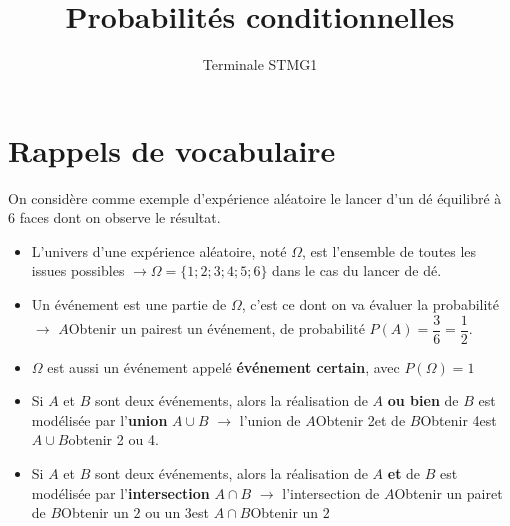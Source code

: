 \documentclass{poly}
\title{Probabilités conditionnelles}
\author{Terminale STMG1}
\date{}
\begin{document}
\maketitle

\section{Rappels de vocabulaire}
On considère comme exemple d'expérience aléatoire le lancer d'un dé équilibré à 6 faces dont on observe le résultat.
\begin{tcolorbox}
\begin{itemize}
\item L'univers d'une expérience aléatoire, noté $\Omega$, est l'ensemble de toutes les issues possibles $\to \Omega = \{1;2;3;4;5;6\}$ dans le cas du lancer de dé.
\item Un événement est une partie de $\Omega$, c'est ce dont on va évaluer la probabilité $\to$ $A$\og Obtenir un pair\fg est un événement, de probabilité $P(A) = \dfrac{3}{6} = \dfrac{1}{2}$.
\item $\Omega$ est aussi un événement appelé \textbf{événement certain}, avec $P(\Omega) = 1$
\item Si $A$ et $B$ sont deux événements, alors la réalisation de $A$ \textbf{ou bien} de $B$ est modélisée par l'\textbf{union} $A \cup B$ $\to$ l'union de $A$\og Obtenir 2\fg et de $B$\og Obtenir 4\fg est $A \cup B$\og obtenir 2 ou 4\fg.
\item Si $A$ et $B$ sont deux événements, alors la réalisation de $A$ \textbf{et} de $B$ est modélisée par l'\textbf{intersection} $A \cap B$ $\to$ l'intersection de $A$\og Obtenir un pair\fg et de $B$\og Obtenir un $2$ ou un $3$\fg est $A \cap B$\og Obtenir un $2$\fg
\end{itemize}
\end{tcolorbox}

\newpage
\end{document}
